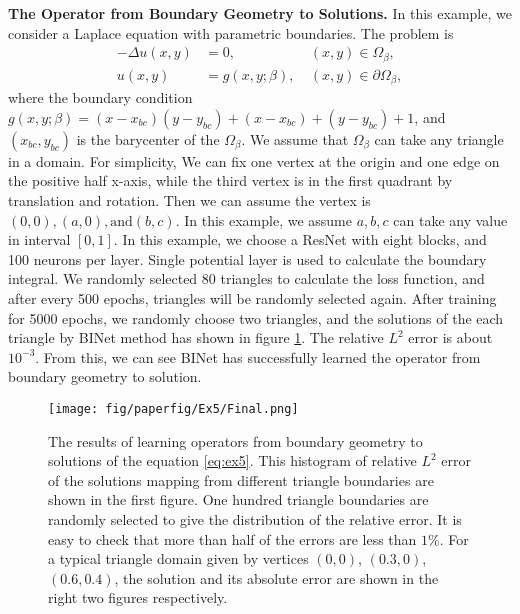 \documentclass[hyperref]{article}
\numberwithin{equation}{section}
\theoremstyle{nonumberplain}
\begin{document}
	\noindent \textbf{The Operator from Boundary Geometry to Solutions.}
	In this example, we consider a Laplace equation with parametric boundaries. The problem is 
	\begin{equation}
		\begin{aligned}
			-\Delta u(x,y) & = 0, \ &(x,y)\in\Omega_\beta,\\
			u(x,y) &= g(x,y;\beta), \ &(x,y)\in\partial\Omega_\beta,
		\end{aligned}
		\label{eq:ex5}
	\end{equation}
	where the boundary condition $g(x,y;\beta)=(x-x_{bc})(y-y_{bc})+(x-x_{bc})+(y-y_{bc})+1$, and $(x_{bc},y_{bc})$ is the barycenter of the $\Omega_\beta$. We assume that $\Omega_\beta$ can take any triangle in a domain. For simplicity, We can fix one vertex at the origin and one edge on the positive half x-axis, while the third vertex is in the first quadrant by translation and rotation. Then we can assume the vertex is $(0,0),(a,0), \text{and} (b,c)$. In this example, we assume $a,b,c$ can take any value in interval $[0,1]$. In this example, we choose a ResNet with eight blocks, and 100 neurons per layer. Single potential layer is used to calculate the boundary integral. We randomly selected 80 triangles to calculate the loss function, and after every 500 epochs, triangles will be randomly selected again. After training for 5000 epochs, we randomly choose two triangles, and the solutions of the each triangle by BINet method has shown in figure \ref{fig.Ex6}. The relative $L^2$ error is about $10^{-3}$. From this, we can see BINet has successfully learned the operator from boundary geometry to solution.
	\begin{figure}[t]
		\centering
		\texttt{[image: fig/paperfig/Ex5/Final.png]}
		\caption{The results of learning operators from boundary geometry to solutions of the equation \eqref{eq:ex5}. This histogram of relative $L^2$ error of the solutions mapping from different triangle boundaries are shown in the first figure. One hundred triangle boundaries are randomly selected to give the distribution of the relative error. It is easy to check that more than half of the errors are less than $1\%$. For a typical triangle domain given by vertices $(0,0)$, $(0.3,0)$, $(0.6,0.4)$, the solution and its absolute error are shown in the right two figures respectively.}
		\label{fig.Ex6}
	\end{figure}
	
\end{document}
